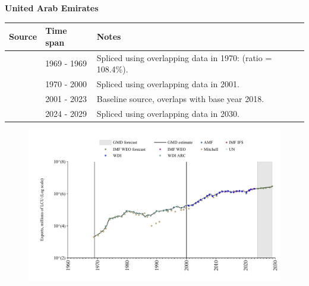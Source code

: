 \documentclass[12pt,a4paper,landscape]{article}
\begin{document}
\begin{adjustbox}{max totalsize={\paperwidth}{\paperheight},center}
\begin{minipage}[t][\textheight][t]{\textwidth}
\vspace*{0.5cm}
{}
\begin{center}
{\Large\bfseries United Arab Emirates}
\end{center}
\vspace{0.5cm}
\begin{table}[H]
\centering
\small
\begin{tabular}{|l|l|l|}
\hline
\textbf{Source} & \textbf{Time span} & \textbf{Notes} \\
\hline
\rowcolor{white}\cite{Mitchell}& 1969 - 1969 &Spliced using overlapping data in 1970: (ratio = 108.4\%).\\
\rowcolor{lightgray}\cite{UN}& 1970 - 2000 &Spliced using overlapping data in 2001.\\
\rowcolor{white}\cite{WDI}& 2001 - 2023 &Baseline source, overlaps with base year 2018.\\
\rowcolor{lightgray}\cite{IMF_WEO_forecast}& 2024 - 2029 &Spliced using overlapping data in 2030.\\
\hline
\end{tabular}
\end{table}
\begin{figure}[H]
\centering
\includegraphics[width=\textwidth,height=0.6\textheight,keepaspectratio]{graphs/ARE_exports.pdf}
\end{figure}
\end{minipage}
\end{adjustbox}
\end{document}
